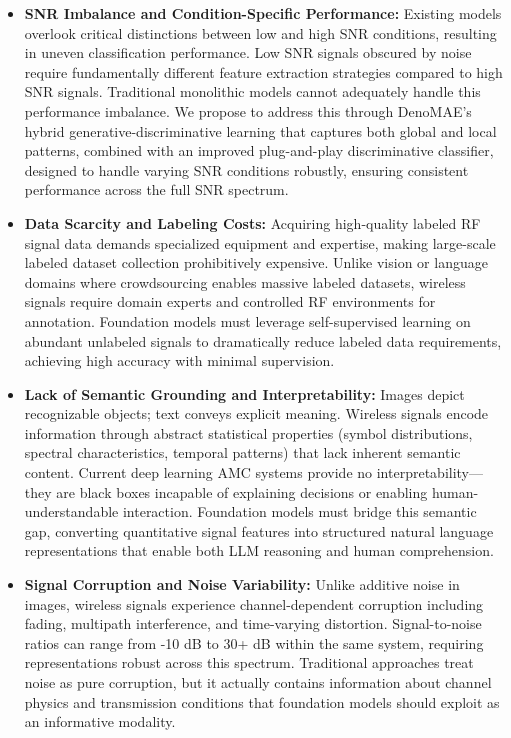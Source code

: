 \begin{itemize}
    \item \textbf{SNR Imbalance and Condition-Specific Performance:} Existing models overlook critical distinctions between low and high SNR conditions\cite{}, resulting in uneven classification performance. Low SNR signals obscured by noise require fundamentally different feature extraction strategies compared to high SNR signals\cite{}. Traditional monolithic models cannot adequately handle this performance imbalance\cite{}. We propose to address this through DenoMAE's hybrid generative-discriminative learning that captures both global and local patterns, combined with an improved plug-and-play discriminative classifier\cite{}, designed to handle varying SNR conditions robustly, ensuring consistent performance across the full SNR spectrum.
    
    \item \textbf{Data Scarcity and Labeling Costs:} Acquiring high-quality labeled RF signal data demands specialized equipment and expertise, making large-scale labeled dataset collection prohibitively expensive\cite{}. Unlike vision or language domains where crowdsourcing enables massive labeled datasets\cite{}, wireless signals require domain experts and controlled RF environments for annotation. Foundation models must leverage self-supervised learning\cite{} on abundant unlabeled signals to dramatically reduce labeled data requirements, achieving high accuracy with minimal supervision.
    
    \item \textbf{Lack of Semantic Grounding and Interpretability:} Images depict recognizable objects; text conveys explicit meaning. Wireless signals encode information through abstract statistical properties (symbol distributions, spectral characteristics, temporal patterns) that lack inherent semantic content\cite{}. Current deep learning AMC systems provide no interpretability—they are black boxes incapable of explaining decisions or enabling human-understandable interaction\cite{}. Foundation models must bridge this semantic gap, converting quantitative signal features into structured natural language representations that enable both LLM reasoning and human comprehension.
    
    \item \textbf{Signal Corruption and Noise Variability:} Unlike additive noise in images, wireless signals experience channel-dependent corruption including fading, multipath interference, and time-varying distortion\cite{}. Signal-to-noise ratios can range from -10 dB to 30+ dB within the same system, requiring representations robust across this spectrum\cite{}. Traditional approaches treat noise as pure corruption, but it actually contains information about channel physics and transmission conditions\cite{} that foundation models should exploit as an informative modality.
    

\end{itemize}
